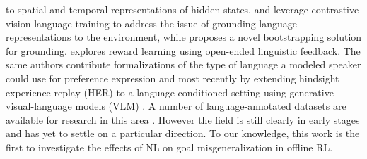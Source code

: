 \documentclass[../main.tex]{subfiles}
\begin{document}
to spatial and temporal representations of hidden states.  and
\citet{fan_minedojo_2022} leverage contrastive vision-language training to address the issue of
grounding language representations to the environment, while \citet{watkins_teachable_2021} proposes
a novel bootstrapping solution for grounding.  explores reward learning
using open-ended linguistic feedback. The same authors contribute formalizations of the type of
language a modeled speaker could use for preference expression \citep{sumers_how_2022} and most
recently by extending hindsight experience replay (HER) \citep{andrychowicz_hindsight_2017} to
a language-conditioned setting using generative visual-language models (VLM)
\citep{alayrac_flamingo_2022}. A number of language-annotated datasets are available for research in
this area \citep{zholus_iglu_2022, mees_calvin_2022, fan_minedojo_2022, shridhar_alfred_2020,
jiang_yunfan_vima_2022, liu_reinforcement_2022}. However the field is still clearly in early stages
and has yet to settle on a particular direction. To our knowledge, this work is the first to
investigate the effects of NL on goal misgeneralization in offline RL.


\ifSubfilesClassLoaded{%
  
}{}
\end{document}
